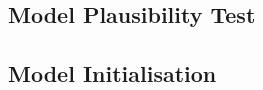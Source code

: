 \documentclass[a4paper, 12pt]{article}
\begin{document}
	\subsection{Model Plausibility Test}
	\subsection{Model Initialisation}
\end{document}
